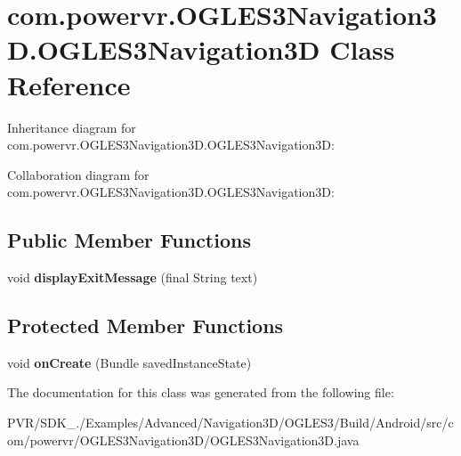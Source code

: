 \hypertarget{classcom_1_1powervr_1_1_o_g_l_e_s3_navigation3_d_1_1_o_g_l_e_s3_navigation3_d}{\section{com.\+powervr.\+O\+G\+L\+E\+S3\+Navigation3\+D.\+O\+G\+L\+E\+S3\+Navigation3\+D Class Reference}
\label{classcom_1_1powervr_1_1_o_g_l_e_s3_navigation3_d_1_1_o_g_l_e_s3_navigation3_d}
}


Inheritance diagram for com.\+powervr.\+O\+G\+L\+E\+S3\+Navigation3\+D.\+O\+G\+L\+E\+S3\+Navigation3\+D\+:


Collaboration diagram for com.\+powervr.\+O\+G\+L\+E\+S3\+Navigation3\+D.\+O\+G\+L\+E\+S3\+Navigation3\+D\+:
\subsection*{Public Member Functions}
\begin{DoxyCompactItemize}
\item 
\hypertarget{classcom_1_1powervr_1_1_o_g_l_e_s3_navigation3_d_1_1_o_g_l_e_s3_navigation3_d_af9cfa9a2b1bfcfe8e20035dbb138217a}{void {\bfseries display\+Exit\+Message} (final String text)}\label{classcom_1_1powervr_1_1_o_g_l_e_s3_navigation3_d_1_1_o_g_l_e_s3_navigation3_d_af9cfa9a2b1bfcfe8e20035dbb138217a}

\end{DoxyCompactItemize}
\subsection*{Protected Member Functions}
\begin{DoxyCompactItemize}
\item 
\hypertarget{classcom_1_1powervr_1_1_o_g_l_e_s3_navigation3_d_1_1_o_g_l_e_s3_navigation3_d_a48a6878fb6c98b3bf47302e180cca6f8}{void {\bfseries on\+Create} (Bundle saved\+Instance\+State)}\label{classcom_1_1powervr_1_1_o_g_l_e_s3_navigation3_d_1_1_o_g_l_e_s3_navigation3_d_a48a6878fb6c98b3bf47302e180cca6f8}

\end{DoxyCompactItemize}


The documentation for this class was generated from the following file\+:\begin{DoxyCompactItemize}
\item 
P\+V\+R/\+S\+D\+K\+\_./\+Examples/\+Advanced/\+Navigation3\+D/\+O\+G\+L\+E\+S3/\+Build/\+Android/src/com/powervr/\+O\+G\+L\+E\+S3\+Navigation3\+D/O\+G\+L\+E\+S3\+Navigation3\+D.\+java\end{DoxyCompactItemize}
